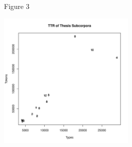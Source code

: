 Figure 3
\begin{knitrout}
\color{fgcolor}
\includegraphics[width=250,height=250]{figure/Figure_3-1} 

\end{knitrout}



